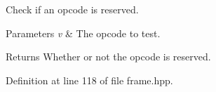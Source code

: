 Check if an opcode is reserved. 


\begin{DoxyParams}{Parameters}
{\em v} & The opcode to test. \\
\hline
\end{DoxyParams}
\begin{DoxyReturn}{Returns}
Whether or not the opcode is reserved. 
\end{DoxyReturn}


Definition at line 118 of file frame.\+hpp.

